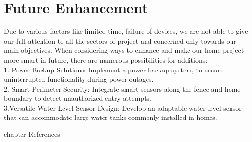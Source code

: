 \documentclass[12pt,a4paper]{report}
\begin{document}
	\section{Future Enhancement}
		\begin{justify}
Due to various factors like limited time, failure of devices, we are not able to give our full attention to all the sectors of project and concerned only towards our main objectives. When considering ways to enhance and make our home project more smart in future, there are numerous  possibilities for additions:\\
		1. Power Backup Solutions: Implement a  power backup system, to ensure uninterrupted functionality during power outages.\\
		2. Smart Perimeter Security: Integrate smart sensors along the fence and home boundary to detect unauthorized entry attempts.\\
		3.Versatile Water Level Sensor Design: Develop an adaptable water level sensor that can accommodate large water tanks commonly installed in homes.
	
		
		
	\end{justify}

		
		
		
		

	
	
	
	
	
	
	
	
	\justifying
	\printbibliography[title={REFERENCES}]
	
	 {chapter} {References}	
	
	
	
	
	
	
	

	
	
\end{document}
